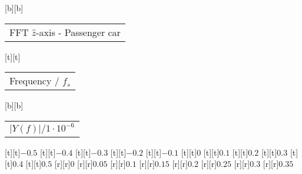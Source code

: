 %
[b][b]{\fontsize{8}{12}\selectfont \setlength{\tabcolsep}{0pt}\begin{tabular}{c}FFT $\hat{z}$-axis - Passenger car\end{tabular}}%
[t][t]{\fontsize{8}{12}\selectfont \setlength{\tabcolsep}{0pt}\begin{tabular}{c}Frequency / $f_s$\end{tabular}}%
[b][b]{\fontsize{8}{12}\selectfont \setlength{\tabcolsep}{0pt}\begin{tabular}{c}$\vert{}Y(f)\vert{}/1\cdot{}10^{-6}$\end{tabular}}%
%
\fontsize{6}{8}%
\selectfont%
%
[t][t]{$-0.5$}%
[t][t]{$-0.4$}%
[t][t]{$-0.3$}%
[t][t]{$-0.2$}%
[t][t]{$-0.1$}%
[t][t]{$0$}%
[t][t]{$0.1$}%
[t][t]{$0.2$}%
[t][t]{$0.3$}%
[t][t]{$0.4$}%
[t][t]{$0.5$}%
%
[r][r]{$0$}%
[r][r]{$0.05$}%
[r][r]{$0.1$}%
[r][r]{$0.15$}%
[r][r]{$0.2$}%
[r][r]{$0.25$}%
[r][r]{$0.3$}%
[r][r]{$0.35$}%
%
%
